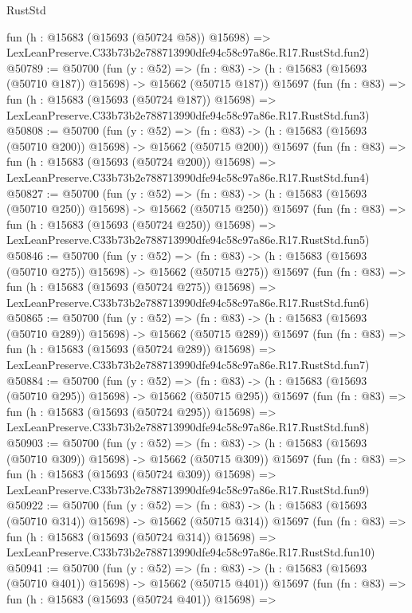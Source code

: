 \begin{lexlean}{RustStd}
\begin{coremodule}
    fun (h : @15683 (@15693 (@50724 @58)) @15698) =>
    LexLeanPreserve.C33b73b2e788713990dfe94c58c97a86e.R17.RustStd.fun2)
@50789 := @50700
    (fun (y : @52) =>
    (fn : @83) -> (h : @15683 (@15693 (@50710 @187)) @15698) -> @15662 (@50715 @187))
    @15697
    (fun (fn : @83) =>
    fun (h : @15683 (@15693 (@50724 @187)) @15698) =>
    LexLeanPreserve.C33b73b2e788713990dfe94c58c97a86e.R17.RustStd.fun3)
@50808 := @50700
    (fun (y : @52) =>
    (fn : @83) -> (h : @15683 (@15693 (@50710 @200)) @15698) -> @15662 (@50715 @200))
    @15697
    (fun (fn : @83) =>
    fun (h : @15683 (@15693 (@50724 @200)) @15698) =>
    LexLeanPreserve.C33b73b2e788713990dfe94c58c97a86e.R17.RustStd.fun4)
@50827 := @50700
    (fun (y : @52) =>
    (fn : @83) -> (h : @15683 (@15693 (@50710 @250)) @15698) -> @15662 (@50715 @250))
    @15697
    (fun (fn : @83) =>
    fun (h : @15683 (@15693 (@50724 @250)) @15698) =>
    LexLeanPreserve.C33b73b2e788713990dfe94c58c97a86e.R17.RustStd.fun5)
@50846 := @50700
    (fun (y : @52) =>
    (fn : @83) -> (h : @15683 (@15693 (@50710 @275)) @15698) -> @15662 (@50715 @275))
    @15697
    (fun (fn : @83) =>
    fun (h : @15683 (@15693 (@50724 @275)) @15698) =>
    LexLeanPreserve.C33b73b2e788713990dfe94c58c97a86e.R17.RustStd.fun6)
@50865 := @50700
    (fun (y : @52) =>
    (fn : @83) -> (h : @15683 (@15693 (@50710 @289)) @15698) -> @15662 (@50715 @289))
    @15697
    (fun (fn : @83) =>
    fun (h : @15683 (@15693 (@50724 @289)) @15698) =>
    LexLeanPreserve.C33b73b2e788713990dfe94c58c97a86e.R17.RustStd.fun7)
@50884 := @50700
    (fun (y : @52) =>
    (fn : @83) -> (h : @15683 (@15693 (@50710 @295)) @15698) -> @15662 (@50715 @295))
    @15697
    (fun (fn : @83) =>
    fun (h : @15683 (@15693 (@50724 @295)) @15698) =>
    LexLeanPreserve.C33b73b2e788713990dfe94c58c97a86e.R17.RustStd.fun8)
@50903 := @50700
    (fun (y : @52) =>
    (fn : @83) -> (h : @15683 (@15693 (@50710 @309)) @15698) -> @15662 (@50715 @309))
    @15697
    (fun (fn : @83) =>
    fun (h : @15683 (@15693 (@50724 @309)) @15698) =>
    LexLeanPreserve.C33b73b2e788713990dfe94c58c97a86e.R17.RustStd.fun9)
@50922 := @50700
    (fun (y : @52) =>
    (fn : @83) -> (h : @15683 (@15693 (@50710 @314)) @15698) -> @15662 (@50715 @314))
    @15697
    (fun (fn : @83) =>
    fun (h : @15683 (@15693 (@50724 @314)) @15698) =>
    LexLeanPreserve.C33b73b2e788713990dfe94c58c97a86e.R17.RustStd.fun10)
@50941 := @50700
    (fun (y : @52) =>
    (fn : @83) -> (h : @15683 (@15693 (@50710 @401)) @15698) -> @15662 (@50715 @401))
    @15697
    (fun (fn : @83) =>
    fun (h : @15683 (@15693 (@50724 @401)) @15698) =>

\end{coremodule}
\end{lexlean}
